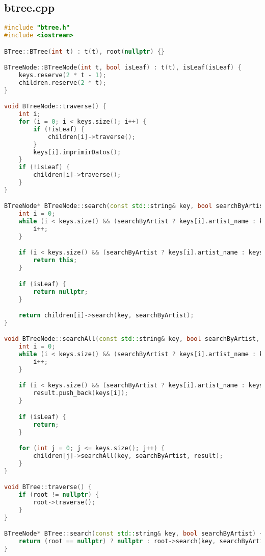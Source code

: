 \documentclass[12pt]{article}
\begin{document}
\begin{flushleft}
            \vspace{1cm}
        \subsection{btree.cpp}
            \begin{lstlisting}[language=C++, style=mystyle, caption={Código de un Árbol B}]
#include "btree.h"
#include <iostream>

BTree::BTree(int t) : t(t), root(nullptr) {}

BTreeNode::BTreeNode(int t, bool isLeaf) : t(t), isLeaf(isLeaf) {
    keys.reserve(2 * t - 1);
    children.reserve(2 * t);
}

void BTreeNode::traverse() {
    int i;
    for (i = 0; i < keys.size(); i++) {
        if (!isLeaf) {
            children[i]->traverse();
        }
        keys[i].imprimirDatos();
    }
    if (!isLeaf) {
        children[i]->traverse();
    }
}

BTreeNode* BTreeNode::search(const std::string& key, bool searchByArtist) {
    int i = 0;
    while (i < keys.size() && (searchByArtist ? keys[i].artist_name : keys[i].track_name) < key) {
        i++;
    }

    if (i < keys.size() && (searchByArtist ? keys[i].artist_name : keys[i].track_name) == key) {
        return this;
    }

    if (isLeaf) {
        return nullptr;
    }

    return children[i]->search(key, searchByArtist);
}

void BTreeNode::searchAll(const std::string& key, bool searchByArtist, std::vector<Cancion>& result) {
    int i = 0;
    while (i < keys.size() && (searchByArtist ? keys[i].artist_name : keys[i].track_name) < key) {
        i++;
    }

    if (i < keys.size() && (searchByArtist ? keys[i].artist_name : keys[i].track_name) == key) {
        result.push_back(keys[i]);
    }

    if (isLeaf) {
        return;
    }

    for (int j = 0; j <= keys.size(); j++) {
        children[j]->searchAll(key, searchByArtist, result);
    }
}

void BTree::traverse() {
    if (root != nullptr) {
        root->traverse();
    }
}

BTreeNode* BTree::search(const std::string& key, bool searchByArtist) {
    return (root == nullptr) ? nullptr : root->search(key, searchByArtist);
}


\end{lstlisting}
\end{flushleft}
\end{document}
